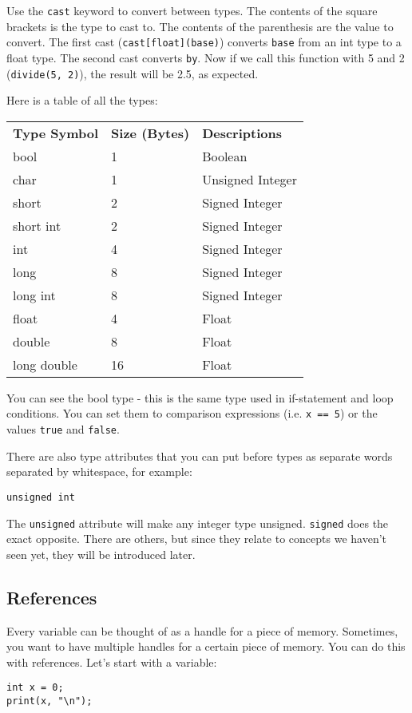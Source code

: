 \documentclass[10pt,a4paper]{article}
\begin{document}
Use the \verb|cast| keyword to convert between types. The contents of the square brackets is the type to cast to. The contents of the parenthesis are the value to convert. The first cast (\verb|cast[float](base)|) converts \verb|base| from an int type to a float type. The second cast converts \verb|by|. Now if we call this function with 5 and 2 (\verb|divide(5, 2)|), the result will be 2.5, as expected.

Here is a table of all the types:\newline
\begin{center}
\begin{tabular}{|l l l|}
\hline
\textbf{Type Symbol} & \textbf{Size (Bytes)} & \textbf{Descriptions} \\
bool & 1 & Boolean \\
char & 1 & Unsigned Integer \\
short & 2 & Signed Integer \\
short int & 2 & Signed Integer \\
int & 4 & Signed Integer \\
long & 8 & Signed Integer \\
long int & 8 & Signed Integer \\
float & 4 & Float \\
double & 8 & Float \\
long double & 16 & Float \\
\hline
\end{tabular}
\end{center}

You can see the bool type - this is the same type used in if-statement and loop conditions. You can set them to comparison expressions (i.e. \verb|x == 5|) or the values \verb|true| and \verb|false|. 

There are also type attributes that you can put before types as separate words separated by whitespace, for example:
\begin{verbatim}
unsigned int
\end{verbatim}

The \verb|unsigned| attribute will make any integer type unsigned. \verb|signed| does the exact opposite. There are others, but since they relate to concepts we haven't seen yet, they will be introduced later.

\newpage





\subsection{References}
Every variable can be thought of as a handle for a piece of memory. Sometimes, you want to have multiple handles for a certain piece of memory. You can do this with references. Let's start with a variable:
\begin{verbatim}
int x = 0;
print(x, "\n");
\end{verbatim}
\end{document}
